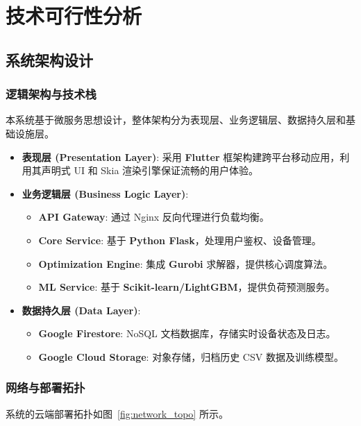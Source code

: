 \chapter{技术可行性分析}

\section{系统架构设计}

\subsection{逻辑架构与技术栈}
本系统基于微服务思想设计，整体架构分为表现层、业务逻辑层、数据持久层和基础设施层。
\begin{itemize}
    \item \textbf{表现层 (Presentation Layer)}: 采用 \textbf{Flutter} 框架构建跨平台移动应用，利用其声明式 UI 和 Skia 渲染引擎保证流畅的用户体验。
    \item \textbf{业务逻辑层 (Business Logic Layer)}:
          \begin{itemize}
              \item \textbf{API Gateway}: 通过 Nginx 反向代理进行负载均衡。
              \item \textbf{Core Service}: 基于 \textbf{Python Flask}，处理用户鉴权、设备管理。
              \item \textbf{Optimization Engine}: 集成 \textbf{Gurobi} 求解器，提供核心调度算法。
              \item \textbf{ML Service}: 基于 \textbf{Scikit-learn/LightGBM}，提供负荷预测服务。
          \end{itemize}
    \item \textbf{数据持久层 (Data Layer)}:
          \begin{itemize}
              \item \textbf{Google Firestore}: NoSQL 文档数据库，存储实时设备状态及日志。
              \item \textbf{Google Cloud Storage}: 对象存储，归档历史 CSV 数据及训练模型。
          \end{itemize}
\end{itemize}

\subsection{网络与部署拓扑}
系统的云端部署拓扑如图~\ref{fig:network_topo} 所示。

